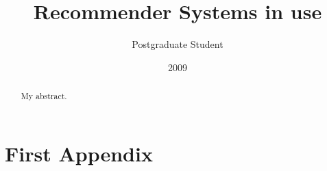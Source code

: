 \documentclass[10pt, oneside]{report}
\title{Recommender Systems in use}
\author{Postgraduate Student}
\date{2009}
\begin{document}
\newcommand\todo[1]{\textcolor{red}{#1}\PackageWarning{TODO:}{#1!}}

\maketitle

\declaration

\dedication{To my ...}

\begin{abstract}
My abstract.
\end{abstract}

\tableofcontents

\chapter{}
\label{chap:chapter1}




\chapter{}
\label{chap:chapter2}



\chapter{}
\label{chap:chapter3}







\chapter{First Appendix}

\end{document}
